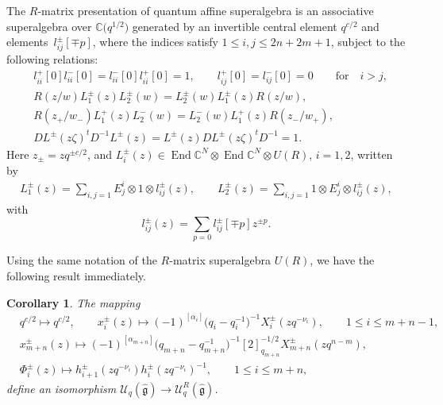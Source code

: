 \documentclass[pdftex]{sigma}
\numberwithin{equation}{section}
\newtheorem{Corollary}[Theorem]{Corollary}
\begin{document}
\begin{Definition}The $R$-matrix presentation of quantum affine superalgebra  is an associative superalgebra over $\mathbb{C}\bigl(q^{1/2}\bigr)$ generated by an invertible central element $q^{c/2}$ and elements~$l_{ij}^{\pm}[\mp p]$, where the indices satisfy $ 1\leq i,j\leq2n+2m+1$,
 subject to the following relations:
\begin{align*}
 &l^+_{ii}[0]l^-_{ii}[0]=l^-_{ii}[0] l^+_{ii}[0]=1, \qquad l^+_{ij}[0]=l^-_{ij}[0]=0\qquad \text{for} \quad i>j,\\
 &R(z/w)L_1^{\pm}(z)L_2^{\pm}(w)=L_2^{\pm}(w)L_1^{\pm}(z) R(z/w),\\
 &R(z_+/w_-)L_1^{+}(z)L_2^{-}(w)=L_2^{-}(w)L_1^{+}(z) R(z_-/w_+),\\
 &DL^{\pm}(z\zeta)^tD^{-1}L^{\pm}(z)=L^{\pm}(z)DL^{\pm}(z\zeta)^tD^{-1}=1.
\end{align*}
Here
 $z_{\pm}=zq^{\pm c/2}$, and $L_i^{\pm}(z)\in \operatorname{End}\mathbb{C}^N\otimes \operatorname{End}\mathbb{C}^N\otimes
 U(R)$, $i=1,2$, written by
\begin{gather*}
 L_1^{\pm}(z)=\sum\limits_{i,j=1}E^i_j\otimes1\otimes l_{ij}^{\pm}(z),\qquad
 L_2^{\pm}(z)=\sum\limits_{i,j=1}1\otimes E^i_j\otimes l_{ij}^{\pm}(z),
\end{gather*}with
\begin{equation*}
 l_{ij}^{\pm}(z)=\sum\limits_{p=0}l_{ij}^{\pm}[\mp p]z^{\pm p}.
\end{equation*}
\end{Definition}

 Using the same notation of the $R$-matrix superalgebra $U(R)$, we have the following result immediately.
\begin{Corollary} The mapping
\begin{align*}
 &q^{c/2}\mapsto q^{c/2},\qquad
 x_i^{\pm}(z)\mapsto(-1)^{[\alpha_i]}\bigl(q_i-q_i^{-1}\bigr)^{-1}X_i^{\pm}(zq^{-\nu_i}),\qquad 1\leq i\leq m+n-1,\\
 &x_{m+n}^{\pm}(z)\mapsto(-1)^{[\alpha_{m+n}]}\bigl(q_{m+n}-q_{m+n}^{-1}\bigr)^{-1}[2]_{q_{m+n}}^{-1/2}X_{m+n}^{\pm}(zq^{n-m}),\\
 &\Phi^{\pm}_{i}(z)\mapsto h_{i+1}^{\pm}(zq^{-\nu_i})h_{i}^{\pm}(zq^{-\nu_i})^{-1},\qquad 1\leq i\leq m+n,
\end{align*}
define an isomorphism $\mathcal{U}_q(\mathfrak{\hat{g}})\rightarrow\mathcal{U}_q^{R}(\mathfrak{\hat{g}})$.
\end{Corollary}
\end{document}
